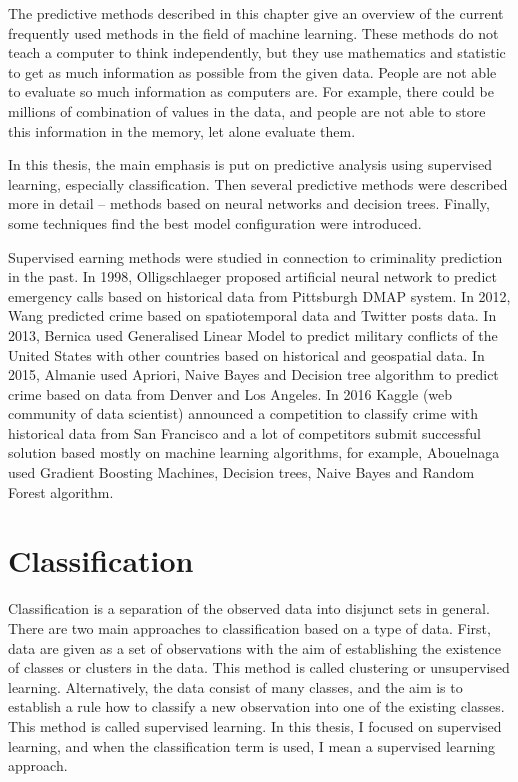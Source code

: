 \documentclass[thesis=M,english]{FITthesis}[2012/10/20]
\begin{document}
The predictive methods described in this chapter give an overview of the current frequently used methods in the field of machine learning. These methods do not teach a computer to think independently, but they use mathematics and statistic to get as much information as possible from the given data. People are not able to evaluate so much information as computers are. For example, there could be millions of combination of values in the data, and people are not able to store this information in the memory, let alone evaluate them.

In this thesis, the main emphasis is put on predictive analysis using supervised learning, especially classification. Then several predictive methods were described more in detail -- methods based on neural networks and decision trees. Finally, some techniques find the best model configuration were introduced. 

Supervised earning methods were studied in connection to criminality prediction in the past. In 1998, Olligschlaeger \cite{Olligschlaeger1998prediction} proposed artificial neural network to predict emergency calls based on historical data from Pittsburgh DMAP system. In 2012, Wang \cite{Wang2012prediction} predicted crime based on spatiotemporal data and Twitter posts data. In 2013, Bernica \cite{Bernica2013prediction} used Generalised Linear Model to predict military conflicts of the United States with other countries based on historical and geospatial data. In 2015, Almanie \cite{Almanie2015prediction} used Apriori, Naive Bayes and Decision tree algorithm to predict crime based on data from Denver and Los Angeles. In 2016 Kaggle \cite{kaggle} (web community of data scientist) announced a competition to classify crime with historical data from San Francisco and a lot of competitors submit successful solution based mostly on machine learning algorithms, for example, Abouelnaga \cite{Abouelnaga2016prediction} used Gradient Boosting Machines, Decision trees, Naive Bayes and Random Forest algorithm.

\section{Classification}

Classification is a separation of the observed data into disjunct sets in general. There are two main approaches to classification based on a type of data. First, data are given as a set of observations with the aim of establishing the existence of classes or clusters in the data. This method is called clustering or unsupervised learning. Alternatively, the data consist of many classes, and the aim is to establish a rule how to classify a new observation into one of the existing classes. This method is called supervised learning.\cite[14]{Michie94machinelearning} In this thesis, I focused on supervised learning, and when the classification term is used, I mean a supervised learning approach. 
\end{document}
